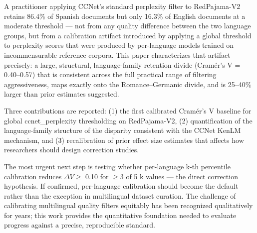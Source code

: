 
A practitioner applying CCNet's standard perplexity filter to RedPajama-V2 retains 86.4\% of Spanish documents but only 16.3\% of English documents at a moderate threshold --- not from any quality difference between the two language groups, but from a calibration artifact introduced by applying a global threshold to perplexity scores that were produced by per-language models trained on incommensurable reference corpora. This paper characterizes that artifact precisely: a large, structural, language-family retention divide (Cramér's V = 0.40--0.57) that is consistent across the full practical range of filtering aggressiveness, maps exactly onto the Romance--Germanic divide, and is 25--40\% larger than prior estimates suggested.

Three contributions are reported: (1) the first calibrated Cramér's V baseline for global ccnet\_perplexity thresholding on RedPajama-V2, (2) quantification of the language-family structure of the disparity consistent with the CCNet KenLM mechanism, and (3) recalibration of prior effect size estimates that affects how researchers should design correction studies.

The most urgent next step is testing whether per-language k-th percentile calibration reduces $\Delta V \geq$ 0.10 for $\geq 3$ of 5 k values --- the direct correction hypothesis. If confirmed, per-language calibration should become the default rather than the exception in multilingual dataset curation. The challenge of calibrating multilingual quality filters equitably has been recognized qualitatively for years; this work provides the quantitative foundation needed to evaluate progress against a precise, reproducible standard.

